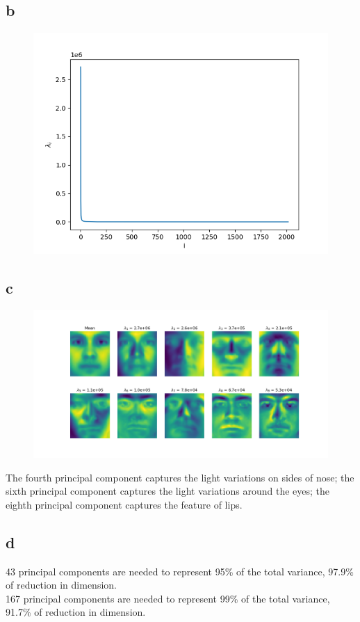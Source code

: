 \documentclass{article}
\begin{document}
\subsection*{b}

\begin{figure}[htbp]
    \centering
    \includegraphics[width=.6\textwidth]{q31.png}
\end{figure}

\subsection*{c}

\begin{figure}[htbp]
    \centering
    \includegraphics[width=.9\textwidth]{q32.png}
\end{figure}
The fourth principal component captures the light variations on sides of nose; the sixth principal component captures the light variations around the eyes; the eighth principal component captures the feature of lips.

\subsection*{d}

43 principal components are needed to represent 95\% of the total variance, 97.9\% of reduction in dimension. \\
167 principal components are needed to represent 99\% of the total variance, 91.7\% of reduction in dimension.
\end{document}
